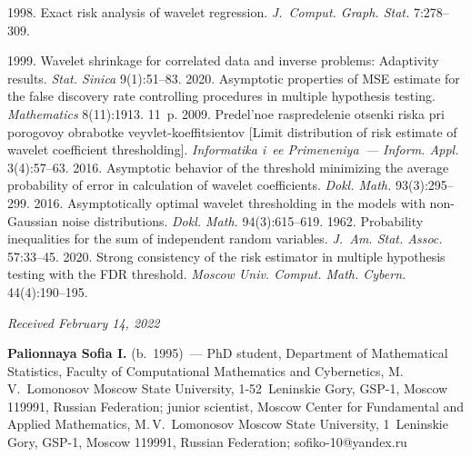 \begin{multicols}{2}
{{\begin{thebibliography}{99}
 


 1998. Exact risk analysis of wavelet regression. \textit{J.~Comput. Graph. Stat.} 7:278--309.
 
 1999. Wavelet shrinkage for correlated data and inverse problems: 
Adaptivity results. \textit{Stat. Sinica} 9(1):51--83.
 2020. Asymptotic properties of MSE estimate for the false discovery rate controlling procedures 
 in multiple hypothesis testing. \textit{Mathematics} 8(11):1913. 11~p.
 2009. Predel'noe raspredelenie otsenki riska pri porogovoy obrabotke 
veyvlet-koeffitsientov [Limit distribution of risk estimate of wavelet coefficient thresholding]. 
\textit{Informatika i~ee Primeneniya~--- Inform. Appl.} 3(4):57--63.
 2016. Asymptotic behavior of the threshold minimizing the average probability of error in calculation
  of wavelet coefficients. \textit{Dokl. Math.} 93(3):295--299.
 2016. Asymptotically optimal wavelet thresholding in the models with non-Gaussian noise distributions. 
 \textit{Dokl. Math.} 94(3):615--619.
 1962. Probability inequalities for the sum of independent random variables. 
 \textit{J.~Am. Stat. Assoc.} 57:33--45.
 2020. Strong consistency of the risk estimator in multiple hypothesis testing with the FDR threshold. 
 \textit{Moscow Univ. Comput. Math. Cybern.} 44(4):190--195.
 \end{thebibliography}

 }
 }

\end{multicols}

\vspace*{-6pt}

\hfill{\small\textit{Received February 14, 2022}}   

\Contr

\noindent
\textbf{Palionnaya Sofia I.} (b.\ 1995)~--- 
PhD student, Department of Mathematical Statistics, Faculty of Computational Mathematics and Cybernetics,
 M.\,V.~Lomonosov Moscow State University, 1-52~Leninskie Gory, GSP-1, Moscow 119991, 
 Russian Federation; junior scientist, Moscow Center for Fundamental and Applied Mathematics, 
 M.\,V.~Lomonosov Moscow State University, 1~Leninskie Gory, GSP-1, Moscow 119991, Russian Federation;
 \mbox{sofiko-10@yandex.ru}

